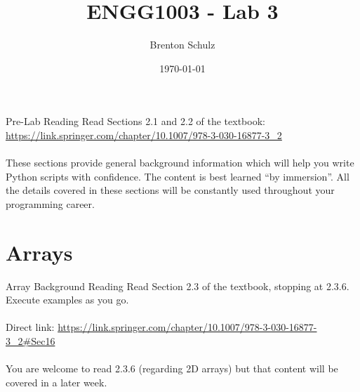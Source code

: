 \documentclass{lab}
\title{ENGG1003 - Lab 3}
\author{Brenton Schulz}
\date{\today}
\begin{document}
\maketitle

\begin{task}{Pre-Lab Reading}{}
Read Sections 2.1 and 2.2 of the textbook: \url{https://link.springer.com/chapter/10.1007/978-3-030-16877-3_2}
\\~\\
These sections provide general background information which will help you write Python scripts with confidence. The content is best learned ``by immersion''. All the details covered in these sections will be constantly used throughout your programming career.
\end{task}

\section{Arrays}

\begin{task}{Array Background Reading}{}
Read Section 2.3 of the textbook, stopping at 2.3.6. Execute examples as you go.
\\~\\
Direct link: \url{https://link.springer.com/chapter/10.1007/978-3-030-16877-3_2#Sec16}
\\~\\
You are welcome to read 2.3.6 (regarding 2D arrays) but that content will be covered in a later week.
\end{task}
\end{document}
